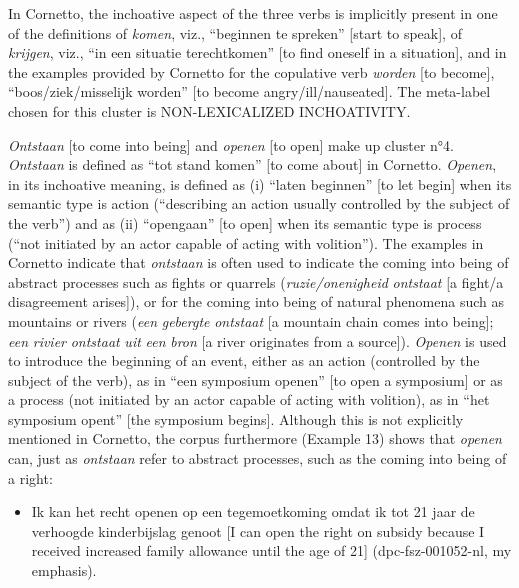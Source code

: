 In Cornetto, the inchoative aspect of the three verbs is implicitly present in one of the definitions of \textit{komen}, viz., “beginnen te spreken” [start to speak], of \textit{krijgen}, viz., “in een situatie terechtkomen” [to find oneself in a situation], and in the examples provided by Cornetto for the copulative verb \textit{worden} [to become], “boos\slash ziek/misselijk worden” [to become angry\slash ill/nauseated]. The meta-label chosen for this cluster is NON-LEXICALIZED INCHOATIVITY.

\textit{Ontstaan} [to come into being] and \textit{openen} [to open] make up cluster n°4. \textit{Ontstaan} is defined as “tot stand komen” [to come about] in Cornetto. \textit{Openen}, in its inchoative meaning, is defined as (i) “laten beginnen” [to let begin] when its semantic type is action (“describing an action usually controlled by the subject of the verb”) and as (ii) “opengaan” [to open] when its semantic type is process (“not initiated by an actor capable of acting with volition”). The examples in Cornetto indicate that \textit{ontstaan} is often used to indicate the coming into being of abstract processes such as fights or quarrels (\textit{ruzie\slash onenigheid} \textit{ontstaat} [a fight\slash a disagreement arises]), or for the coming into being of natural phenomena such as mountains or rivers (\textit{een} \textit{gebergte} \textit{ontstaat} [a mountain chain comes into being]; \textit{een} \textit{rivier} \textit{ontstaat} \textit{uit} \textit{een} \textit{bron} [a river originates from a source]). \textit{Openen} is used to introduce the beginning of an event, either as an action (controlled by the subject of the verb), as in “een symposium openen” [to open a symposium] or as a process (not initiated by an actor capable of acting with volition), as in “het symposium opent” [the symposium begins]. Although this is not explicitly mentioned in Cornetto, the corpus furthermore (Example 13) shows that \textit{openen} can, just as \textit{ontstaan} refer to abstract processes, such as the coming into being of a right:

\begin{itemize}
\item \begin{styleVoorbeeld}
Ik kan het recht openen op een tegemoetkoming omdat ik tot 21 jaar de verhoogde kinderbijslag genoot [I can open the right on subsidy because I received increased family allowance until the age of 21] (dpc-fsz-001052-nl, my emphasis).
\end{styleVoorbeeld}
\end{itemize}

